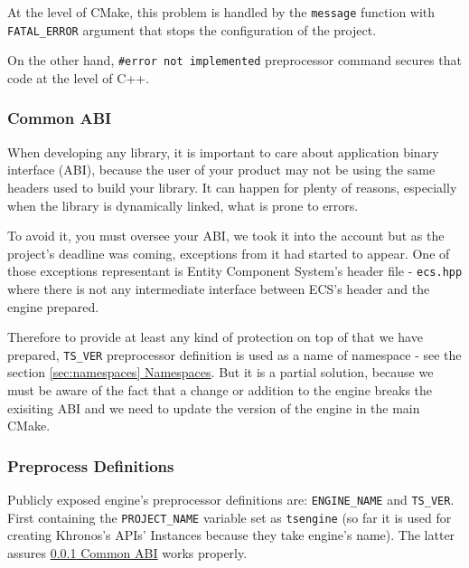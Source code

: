At the level of CMake, this problem is handled by the \texttt{message} function with \texttt{FATAL\_ERROR} argument that stops the configuration of the project.

On the other hand, \texttt{\#error not implemented} preprocessor command secures that code at the level of C++.

\subsubsection{Common ABI}
\label{sec:build_abi}
\hspace{\parindent} When developing any library, it is important to care about application binary interface (ABI), because the user of your product may not be using the same headers used to build your library. It can happen for plenty of reasons, especially when the library is dynamically linked, what is prone to errors.

To avoid it, you must oversee your ABI, we took it into the account but as the project's deadline was coming, exceptions from it had started to appear. One of those exceptions representant is Entity Component System's header file - \texttt{ecs.hpp} where there is not any intermediate interface between ECS's header and the engine prepared.

Therefore to provide at least any kind of protection on top of that we have prepared, \texttt{TS\_VER} preprocessor definition is used as a name of namespace - see the section \hyperref[sec:namespaces]{\ref*{sec:namespaces} Namespaces}. But it is a partial solution, because we must be aware of the fact that a change or addition to the engine breaks the exisiting ABI and we need to update the version of the engine in the main CMake. 

\subsubsection{Preprocess Definitions}
\hspace{\parindent} Publicly exposed engine's preprocessor definitions are: \texttt{ENGINE\_NAME} and \texttt{TS\_VER}.\\ First containing the \texttt{PROJECT\_NAME} variable set as \texttt{tsengine} (so far it is used for creating Khronos's APIs' Instances because they take engine's name). The latter assures \hyperref[sec:build_abi]{\ref{sec:build_abi} Common ABI} works properly.

